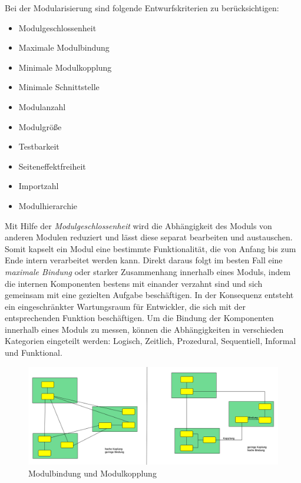     Bei der Modularisierung sind folgende Entwurfskriterien zu berücksichtigen: 
    \begin{itemize}
      \item Modulgeschlossenheit 
      \item Maximale Modulbindung 
      \item Minimale Modulkopplung 
      \item Minimale Schnittstelle 
      \item Modulanzahl 
      \item Modulgröße 
      \item Testbarkeit 
      \item Seiteneffektfreiheit 
      \item Importzahl 
      \item Modulhierarchie 
    \end{itemize}
    Mit Hilfe der \textit{Modulgeschlossenheit} wird die Abhängigkeit des Moduls von anderen Modulen reduziert und lässt diese separat bearbeiten und austauschen. Somit kapselt ein Modul eine bestimmte Funktionalität, die von Anfang bis zum Ende intern verarbeitet werden kann. Direkt daraus folgt im besten Fall eine \textit{maximale Bindung} oder starker Zusammenhang innerhalb eines Moduls, indem die internen Komponenten bestens mit einander verzahnt sind und sich gemeinsam mit eine gezielten Aufgabe beschäftigen. In der Konsequenz entsteht ein eingeschränkter Wartungsraum für Entwickler, die sich mit der entsprechenden Funktion beschäftigen. Um die Bindung der Komponenten innerhalb eines Moduls zu messen, können die Abhängigkeiten in verschieden Kategorien eingeteilt werden: Logisch, Zeitlich, Prozedural, Sequentiell, Informal und Funktional.

    \begin{figure}[h]
      \includegraphics[width=\textwidth]{material/images/kopplung.png}
      \caption{Modulbindung und Modulkopplung}
      \label{fig:kopplung}
    \end{figure}

